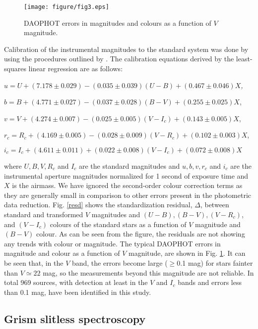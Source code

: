 \documentclass[a4paper,fleqn,usenatbib,useAMS]{mnras}
\begin{document}
\begin{figure}
\centering
\texttt{[image: figure/fig3.eps]}
\caption{\label{err}DAOPHOT errors in magnitudes and colours as a function
of $V$ magnitude.  } 
\end{figure}         

Calibration of the instrumental magnitudes to the standard system was
done by using the procedures outlined by \citet{1992ASPC...25..297S}.
The calibration equations
derived by the least-squares linear regression are as follows:\\

{\it  \small
\noindent
$u= U + (7.178\pm0.029) -(0.035\pm0.039)(U-B) + (0.467\pm0.046)X$,

\noindent
$b= B + (4.771\pm0.027) -(0.037\pm0.028)(B-V) + (0.255\pm0.025)X$,

\noindent
$v= V + (4.274\pm0.007) -(0.025\pm0.005)(V-I_c) + (0.143\pm0.005)X$,

\noindent
$r_c= R_c + (4.169\pm0.005) -(0.028\pm0.009)(V-R_c) + (0.102\pm0.003)X$,

\noindent
$i_c= I_c + (4.611\pm0.011) +(0.022\pm0.008)(V-I_c) + (0.072\pm0.008)X$ \\

}

where $U,B,V,R_c$ and $I_c$ are the standard magnitudes and $u,b,v,r_c$ and $i_c$ are the
instrumental aperture magnitudes normalized for 1 second of exposure time and $X$
is the airmass. We have ignored the second-order colour correction terms as they are generally
small in comparison to other errors present in the photometric data reduction.
Fig. \ref{resd} shows the standardization residual, $\Delta$, between standard and transformed
$V$ magnitudes and $(U-B), (B-V), (V-R_c)$, and $(V-I_c)$ colours of the standard stars as a function of $V$ magnitude and $(B-V)$ colour. 
As can be seen from the figure, the residuals are not showing any trends with colour or magnitude.
The typical DAOPHOT errors in magnitude and colour as a function of $V$ magnitude,
are shown in Fig. \ref{err}.
It can be seen that, in the $V$ band, the errors become large ($\ge$0.1 mag) for stars
fainter than $V\simeq22$ mag, so the measurements beyond this magnitude are not reliable.
In total 969 sources, with detection at least in the $V$ and $I_c$ bands and errors less than 0.1 mag,
have been identified in this study.



\subsection{Grism slitless spectroscopy}
\end{document}
